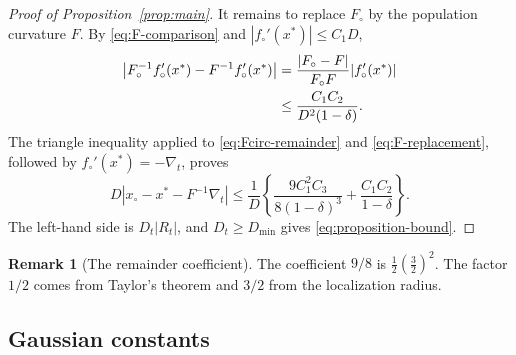 \documentclass[11pt]{article}
\newcommand{\IF}{F}
\newcommand{\IFP}{F_{\circ}}
\newcommand{\DFN}{D}
\newcommand{\fp}{f_{\circ}}
\newcommand{\xs}{x^{*}}
\newcommand{\xp}{x_{\circ}}
\theoremstyle{definition}
\newtheorem*{remark}{Remark}
\begin{document}
\begin{proof}[Proof of Proposition~\ref{prop:main}]
It remains to replace \(\IFP\) by the population curvature \(\IF\).  By
\eqref{eq:F-comparison} and \(|\fp'(\xs)|\leq C_1\DFN\),
\begin{align}
  \left|\IFP^{-1}\fp'(\xs)-\IF^{-1}\fp'(\xs)\right|
  &=\frac{|\IFP-\IF|}{\IFP\IF}|\fp'(\xs)|
  \notag\\
  &\leq\frac{C_1C_2}{\DFN^2(1-\delta)}.
  \label{eq:F-replacement}
\end{align}
The triangle inequality applied to \eqref{eq:Fcirc-remainder} and
\eqref{eq:F-replacement}, followed by \(\fp'(\xs)=-\nabla_t\), proves
\begin{equation}
  \DFN\left|
    \xp-\xs-\IF^{-1}\nabla_t
  \right|
  \leq
  \frac{1}{\DFN}
  \left\{
    \frac{9C_1^2C_3}{8(1-\delta)^3}
    +\frac{C_1C_2}{1-\delta}
  \right\}.
  \label{eq:pointwise-final}
\end{equation}
The left-hand side is \(\DFN_t|R_t|\), and
\(\DFN_t\geq\DFN_{\min}\) gives \eqref{eq:proposition-bound}.
\end{proof}

\begin{remark}[The remainder coefficient]
The coefficient \(9/8\) is \(\tfrac12(\tfrac32)^2\).  The factor \(1/2\)
comes from Taylor's theorem and \(3/2\) from the localization radius.
\end{remark}

\subsection{Gaussian constants}
\end{document}
